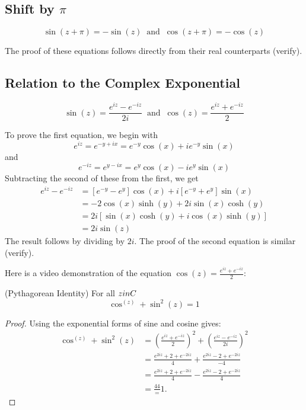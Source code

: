 \documentclass[handout]{ximera}
\begin{document}
\subsection{Shift by $\pi$}
\begin{proposition}
\[
\sin(z + \pi) = -\sin(z) \;\; \mbox{and} \;\; \cos(z+\pi) = -\cos(z)
\]
\end{proposition}
The proof of these equations follows directly from their real counterparts (verify).

\subsection{Relation to the Complex Exponential}
\begin{proposition}
\[
\sin(z) = \frac{e^{iz} - e^{-iz}}{2i} \;\; \mbox{and} \;\;  \cos(z) = \frac{e^{iz} + e^{-iz}}{2}
\]
\end{proposition}
To prove the first equation, we begin with
\[
e^{iz} = e^{-y+ix} = e^{-y}\cos(x) + ie^{-y}\sin(x)
\]
and
\[
e^{-iz} = e^{y-ix} = e^{y}\cos(x) - ie^{y}\sin(x)
\]
Subtracting the second of these from the first, we get
\begin{align*}
e^{iz} - e^{-iz} &= \left[e^{-y}-e^y\right]\cos(x) + i\left[e^{-y}+e^y\right]\sin(x)\\
&=-2\cos(x) \sinh(y) +2i \sin(x)\cosh(y)\\
& = 2i\left[\sin(x)\cosh(y) + i \cos(x)\sinh(y)\right]\\
&=2i\sin(z)
\end{align*}
The result follows by dividing by $2i$.
The proof of the second equation is similar (verify).

Here is a video demonstration of the equation $\cos(z) = \frac{e^{iz}+e^{-iz}}{2}$:\\
\begin{foldable}
\end{foldable}

\begin{corollary}(Pythagorean Identity)
  For all $z in \\C$
  \[\cos^(z) + \sin^2(z) = 1\]
  
\end{corollary}
\begin{proof}
  Using the exponential forms of sine and cosine gives:
  \begin{align*}
    \cos^(z) + \sin^2(z) &= \left(\frac{e^{iz} + e^{-iz}}{2}\right)^2 + \left(\frac{e^{iz} - e^{-iz}}{2i}  \right)^2\\
                         &= \frac{e^{2iz} + 2 + e^{-2iz}}{4} + \frac{e^{2iz} - 2 + e^{-2iz}}{-4}\\
                         &= \frac{e^{2iz} + 2 + e^{-2iz}}{4} - \frac{e^{2iz} - 2 + e^{-2iz}}{4}\\
                         &= \frac{44} = 1.                
  \end{align*}
\end{proof}
\end{document}
